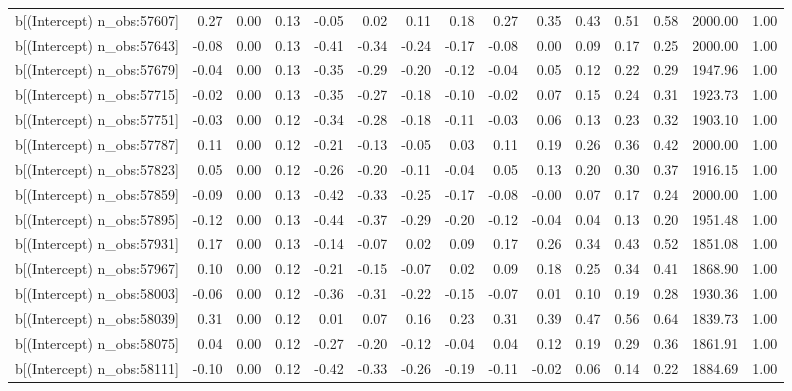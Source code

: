 \begin{table}[ht]
\begin{tabular}{rrrrrrrrrrrrrrr}
  b[(Intercept) n\_obs:57607] & 0.27 & 0.00 & 0.13 & -0.05 & 0.02 & 0.11 & 0.18 & 0.27 & 0.35 & 0.43 & 0.51 & 0.58 & 2000.00 & 1.00 \\ 
  b[(Intercept) n\_obs:57643] & -0.08 & 0.00 & 0.13 & -0.41 & -0.34 & -0.24 & -0.17 & -0.08 & 0.00 & 0.09 & 0.17 & 0.25 & 2000.00 & 1.00 \\ 
  b[(Intercept) n\_obs:57679] & -0.04 & 0.00 & 0.13 & -0.35 & -0.29 & -0.20 & -0.12 & -0.04 & 0.05 & 0.12 & 0.22 & 0.29 & 1947.96 & 1.00 \\ 
  b[(Intercept) n\_obs:57715] & -0.02 & 0.00 & 0.13 & -0.35 & -0.27 & -0.18 & -0.10 & -0.02 & 0.07 & 0.15 & 0.24 & 0.31 & 1923.73 & 1.00 \\ 
  b[(Intercept) n\_obs:57751] & -0.03 & 0.00 & 0.12 & -0.34 & -0.28 & -0.18 & -0.11 & -0.03 & 0.06 & 0.13 & 0.23 & 0.32 & 1903.10 & 1.00 \\ 
  b[(Intercept) n\_obs:57787] & 0.11 & 0.00 & 0.12 & -0.21 & -0.13 & -0.05 & 0.03 & 0.11 & 0.19 & 0.26 & 0.36 & 0.42 & 2000.00 & 1.00 \\ 
  b[(Intercept) n\_obs:57823] & 0.05 & 0.00 & 0.12 & -0.26 & -0.20 & -0.11 & -0.04 & 0.05 & 0.13 & 0.20 & 0.30 & 0.37 & 1916.15 & 1.00 \\ 
  b[(Intercept) n\_obs:57859] & -0.09 & 0.00 & 0.13 & -0.42 & -0.33 & -0.25 & -0.17 & -0.08 & -0.00 & 0.07 & 0.17 & 0.24 & 2000.00 & 1.00 \\ 
  b[(Intercept) n\_obs:57895] & -0.12 & 0.00 & 0.13 & -0.44 & -0.37 & -0.29 & -0.20 & -0.12 & -0.04 & 0.04 & 0.13 & 0.20 & 1951.48 & 1.00 \\ 
  b[(Intercept) n\_obs:57931] & 0.17 & 0.00 & 0.13 & -0.14 & -0.07 & 0.02 & 0.09 & 0.17 & 0.26 & 0.34 & 0.43 & 0.52 & 1851.08 & 1.00 \\ 
  b[(Intercept) n\_obs:57967] & 0.10 & 0.00 & 0.12 & -0.21 & -0.15 & -0.07 & 0.02 & 0.09 & 0.18 & 0.25 & 0.34 & 0.41 & 1868.90 & 1.00 \\ 
  b[(Intercept) n\_obs:58003] & -0.06 & 0.00 & 0.12 & -0.36 & -0.31 & -0.22 & -0.15 & -0.07 & 0.01 & 0.10 & 0.19 & 0.28 & 1930.36 & 1.00 \\ 
  b[(Intercept) n\_obs:58039] & 0.31 & 0.00 & 0.12 & 0.01 & 0.07 & 0.16 & 0.23 & 0.31 & 0.39 & 0.47 & 0.56 & 0.64 & 1839.73 & 1.00 \\ 
  b[(Intercept) n\_obs:58075] & 0.04 & 0.00 & 0.12 & -0.27 & -0.20 & -0.12 & -0.04 & 0.04 & 0.12 & 0.19 & 0.29 & 0.36 & 1861.91 & 1.00 \\ 
  b[(Intercept) n\_obs:58111] & -0.10 & 0.00 & 0.12 & -0.42 & -0.33 & -0.26 & -0.19 & -0.11 & -0.02 & 0.06 & 0.14 & 0.22 & 1884.69 & 1.00 \\ 

\end{tabular}
\end{table}

